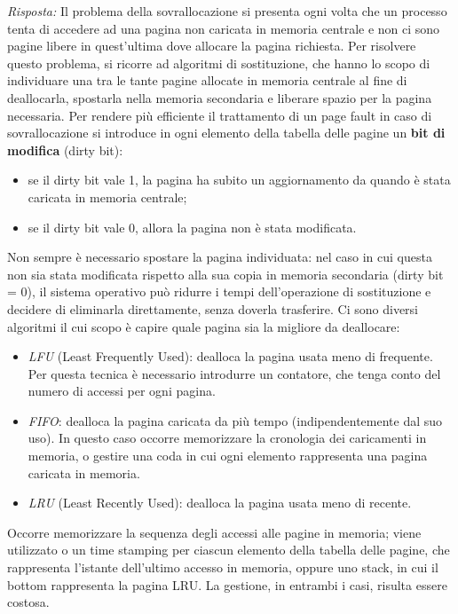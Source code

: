 \documentclass{article}
\newenvironment{solution}
    {\textit{Risposta:}}
    {}
\begin{document}
\begin{solution}
Il problema della sovrallocazione si presenta ogni volta che un processo tenta di accedere ad una pagina non caricata in memoria centrale e non ci sono pagine libere in quest’ultima dove allocare la pagina richiesta.
\newline
Per risolvere questo problema, si ricorre ad algoritmi di sostituzione, che hanno lo scopo di individuare una tra le tante pagine allocate in memoria centrale al fine di deallocarla, spostarla nella memoria secondaria e liberare spazio per la pagina necessaria.
\newline
Per rendere più efficiente il trattamento di un page fault in caso di sovrallocazione si introduce in ogni elemento della tabella delle pagine un \textbf{bit di modifica} (dirty bit):
\begin{itemize}
    \item se il dirty bit vale 1, la pagina ha subito un aggiornamento da quando è stata caricata in memoria centrale;
    \item se il dirty bit vale 0, allora la pagina non è stata modificata.
\end{itemize}
Non sempre è necessario spostare la pagina individuata: nel caso in cui questa non sia stata modificata rispetto alla sua copia in memoria secondaria (dirty bit = 0), il sistema operativo può ridurre i tempi dell’operazione di sostituzione e decidere di eliminarla direttamente, senza doverla trasferire.
\newline
Ci sono diversi algoritmi il cui scopo è capire quale pagina sia la migliore da deallocare:
\begin{itemize}
    \item \emph{LFU} (Least Frequently Used): dealloca la pagina usata meno di frequente.\newline
    Per questa tecnica è necessario introdurre un contatore, che tenga conto del numero di accessi per ogni pagina.
    \item \emph{FIFO}: dealloca la pagina caricata da più tempo (indipendentemente dal suo uso).
In questo caso occorre memorizzare la cronologia dei caricamenti in memoria, o gestire una coda in cui ogni elemento rappresenta una pagina caricata in memoria.
    \item \emph{LRU} (Least Recently Used): dealloca la pagina usata meno di recente.
\end{itemize}
Occorre memorizzare la sequenza degli accessi alle pagine in memoria; viene utilizzato o un time stamping per ciascun elemento della tabella delle pagine, che rappresenta l’istante dell’ultimo accesso in memoria, oppure uno stack, in cui il bottom rappresenta la pagina LRU.
\newline
La gestione, in entrambi i casi, risulta essere costosa.
\end{solution}
\end{document}
